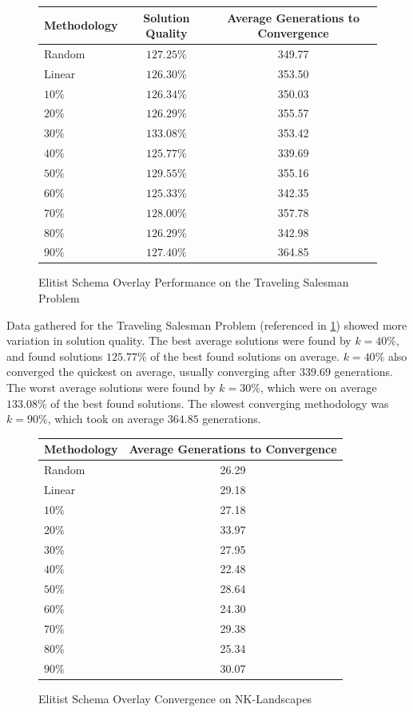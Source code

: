 \begin{figure}[hbtp!]
\begin{center}
\begin{tabular}{ | l | c | c | }
\hline
Methodology & Solution Quality & Average Generations to Convergence \\
\hline
Random & $127.25\%$ & 349.77 \\
\hline
Linear & $126.30\%$ & 353.50 \\
\hline
$10\%$ & $126.34\%$ & 350.03 \\
\hline
$20\%$ & $126.29\%$ & 355.57 \\
\hline
$30\%$ & $133.08\%$ & 353.42 \\
\hline
$40\%$ & $125.77\%$ & 339.69 \\
\hline
$50\%$ & $129.55\%$ & 355.16 \\
\hline
$60\%$ & $125.33\%$ & 342.35 \\
\hline
$70\%$ & $128.00\%$ & 357.78 \\
\hline
$80\%$ & $126.29\%$ & 342.98 \\
\hline
$90\%$ & $127.40\%$ & 364.85 \\
\hline
\end{tabular}
\caption{Elitist Schema Overlay Performance on the Traveling Salesman Problem}
\label{fig:eso_tsp}
\end{center}
\end{figure}

Data gathered for the Traveling Salesman Problem (referenced in \ref{fig:eso_tsp}) showed more variation in solution quality. The best average solutions were found by $k=40\%$, and found solutions $125.77\%$ of the best found solutions on average. $k=40\%$ also converged the quickest on average, usually converging after $339.69$ generations. The worst average solutions were found by $k=30\%$, which were on average $133.08\%$ of the best found solutions. The slowest converging methodology was $k=90\%$, which took on average $364.85$ generations.

\begin{figure}[hbtp!]
\begin{center}
\begin{tabular}{ | l | c | }
\hline
Methodology & Average Generations to Convergence \\
\hline
Random & 26.29 \\
\hline
Linear & 29.18 \\
\hline
$10\%$ & 27.18 \\
\hline
$20\%$ &  33.97 \\
\hline
$30\%$ & 27.95 \\
\hline
$40\%$ & 22.48 \\
\hline
$50\%$ & 28.64 \\
\hline
$60\%$ & 24.30 \\
\hline
$70\%$ & 29.38 \\
\hline
$80\%$ & 25.34 \\
\hline
$90\%$ & 30.07 \\
\hline
\end{tabular}
\caption{Elitist Schema Overlay Convergence on NK-Landscapes}
\label{fig:eso_nk}
\end{center}
\end{figure}

